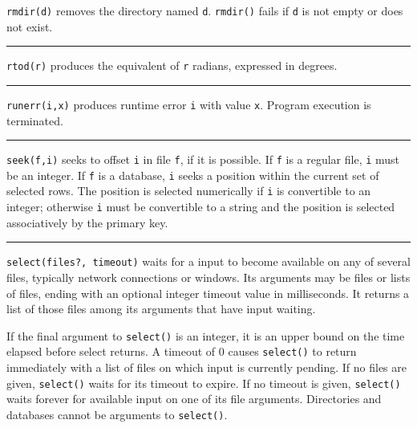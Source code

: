 \noindent
{}\texttt{rmdir(d)} removes the directory named
\texttt{d}. \texttt{rmdir()} fails if \texttt{d} is not empty or does
not exist.

\bigskip\hrule\vspace{0.1cm}

\noindent
{}\texttt{rtod(r)} produces the
equivalent of \texttt{r} radians, expressed in degrees.

\bigskip\hrule\vspace{0.1cm}

\noindent
{}\texttt{runerr(i,x)} produces runtime error
\texttt{i} with value \texttt{x}. Program execution is terminated.

\bigskip\hrule\vspace{0.1cm}

\noindent
{}\texttt{seek(f,i)} seeks to offset \texttt{i} in file
\texttt{f}, if it is possible. If \texttt{f} is a regular file,
\texttt{i} must be an integer. If \texttt{f} is a database, \texttt{i}
seeks a position within the current set of selected rows. The position
is selected numerically if \texttt{i} is convertible to an integer;
otherwise \texttt{i} must be convertible to a string and the position
is selected associatively by the primary key.

\bigskip\hrule\vspace{0.1cm}

\noindent
\texttt{select(files?, timeout)} waits for a input to become available
on any of several files, typically network connections or windows. Its
arguments may be files or lists of files, ending with an optional
integer timeout value in milliseconds. It returns a list of those files
among its arguments that have input waiting.

If the final argument to \texttt{select()} is an
integer, it is an upper bound on the time elapsed before select
returns. A timeout of 0 causes \texttt{select()} to return immediately
with a list of files on which input is currently pending. If no files
are given, \texttt{select()} waits for its timeout to expire. If no
timeout is given, \texttt{select()} waits forever for available input
on one of its file arguments. Directories and databases cannot be
arguments to \texttt{select()}.

